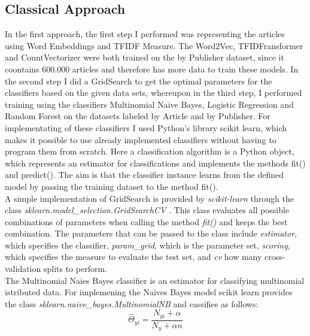 \documentclass[a4paper, 11pt,titlepage,oneside,openany]{book}
\begin{document}
\subsection{Classical Approach}
In the first approach, the first step I performed was representing the articles using Word Embeddings and TFIDF Measure. The Word2Vec, TFIDFransformer and CountVectorizer were both trained on the by Publisher dataset, since it coontains 600.000  articles and therefore has more data to train these models. In the second step I did a GridSearch to get the optimal parameters for the classifiers based on the given data sets, whereupon in the third step, I performed training using the classifiers Multinomial Naive Bayes, Logistic Regression and Random Forest on the datasets labeled by Article and by Publisher. For implementating of these classifiers I used Python's library scikit learn, which makes it possible to use already implemented classifiers without having to program them from scratch. Here a classification algorithm is a Python object, which represents an estimator for classifications and implements the methods fit() and predict(). The aim is that the classifier instance learns from the defined model by passing the training dataset to the method fit().\\
\indent A simple implementation of GridSearch is provided by \textit{scikit-learn} through the class \textit{sklearn.model\_selection.GridSearchCV} \cite{codegridsearch}. This class evaluates all possible combinations of parameters when calling the method \textit{fit()} and keeps the best combination. The parameters that can be passed to the class include \textit{estimator}, which specifies the classifier, \textit{param\_grid}, which is the parameter set, \textit{scoring}, which specifies the measure to evaluate the test set, and \textit{cv} how many cross-validation splits to perform. \\
\indent The Multinomial Naies Bayes classifier is an estimator for classifying multinomial istributed data. For implemening the Naives Bayes model scikit learn provides the class \textit{sklearn.naive\_bayes.MultinomialNB} \cite{codemulinomialnb} and cassifies as follows:
\[
\hat{\Theta}_{yi}=\frac{N_{yi}+\alpha}{N_y + \alpha n}
\]
\end{document}
